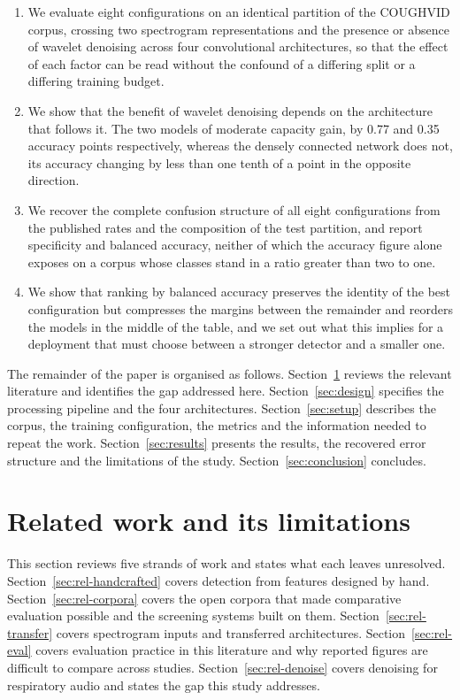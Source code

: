 \documentclass[pdflatex,sn-mathphys-num]{sn-jnl}
\begin{document}
\begin{enumerate}
\item We evaluate eight configurations on an identical partition of the
COUGHVID corpus, crossing two spectrogram representations and the presence or
absence of wavelet denoising across four convolutional architectures, so that
the effect of each factor can be read without the confound of a differing
split or a differing training budget.
\item We show that the benefit of wavelet denoising depends on the
architecture that follows it. The two models of moderate capacity gain, by
0.77 and 0.35 accuracy points respectively, whereas the densely connected
network does not, its accuracy changing by less than one tenth of a point in
the opposite direction.
\item We recover the complete confusion structure of all eight configurations
from the published rates and the composition of the test partition, and report
specificity and balanced accuracy, neither of which the accuracy figure alone
exposes on a corpus whose classes stand in a ratio greater than two to one.
\item We show that ranking by balanced accuracy preserves the identity of the
best configuration but compresses the margins between the remainder and
reorders the models in the middle of the table, and we set out what this
implies for a deployment that must choose between a stronger detector and a
smaller one.
\end{enumerate}

The remainder of the paper is organised as follows.
Section~\ref{sec:related} reviews the relevant literature and identifies the
gap addressed here. Section~\ref{sec:design} specifies the processing pipeline
and the four architectures. Section~\ref{sec:setup} describes the corpus, the
training configuration, the metrics and the information needed to repeat the
work. Section~\ref{sec:results} presents the results, the recovered error
structure and the limitations of the study. Section~\ref{sec:conclusion}
concludes.

\section{Related work and its limitations}\label{sec:related}

This section reviews five strands of work and states what each leaves
unresolved. Section~\ref{sec:rel-handcrafted} covers detection from features
designed by hand. Section~\ref{sec:rel-corpora} covers the open corpora that
made comparative evaluation possible and the screening systems built on them.
Section~\ref{sec:rel-transfer} covers spectrogram inputs and transferred
architectures. Section~\ref{sec:rel-eval} covers evaluation practice in this
literature and why reported figures are difficult to compare across studies.
Section~\ref{sec:rel-denoise} covers denoising for respiratory audio and
states the gap this study addresses.
\end{document}
